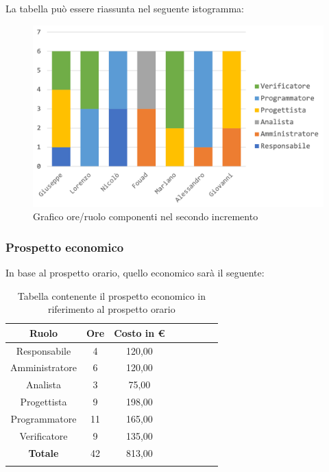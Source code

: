 		La tabella può essere riassunta nel seguente istogramma:
		\begin{figure}[H]
			\centering
			\includegraphics[width=0.8\linewidth]{./images/preventivo/incremento2-1.png}
			\caption{Grafico ore/ruolo componenti nel secondo incremento}
			\label{fig:grafico suddivione ruoli incremento II}
		\end{figure}
		
		\subsubsection{Prospetto economico}
		In base al prospetto orario, quello economico sarà il seguente: 
		
		\begin{longtable}{|c|c|c|c|c|c|c|c|}
			\hline
			\rowcolor{lighter-grayer}
			\textbf{Ruolo} & \textbf{Ore} & \textbf{Costo in € } \\
			\hline
			\endfirsthead
			
			\hline
			Responsabile 	    & 4 & 120,00\\
			\hline 
			\hline
			Amministratore	   & 6 & 120,00\\
			\hline
			\hline
			Analista 				& 3 & 75,00\\
			\hline
			\hline
			Progettista 		   & 9 & 198,00\\
			\hline
			\hline
			Programmatore 	  & 11 & 165,00\\
			\hline
			\hline
			Verificatore 		   & 9 & 135,00\\
			\hline
			\textbf{Totale} 	 & 42 & 813,00\\
			\hline
			\caption{Tabella contenente il prospetto economico in riferimento al prospetto orario}
		\end{longtable}
		\pagebreak
		
